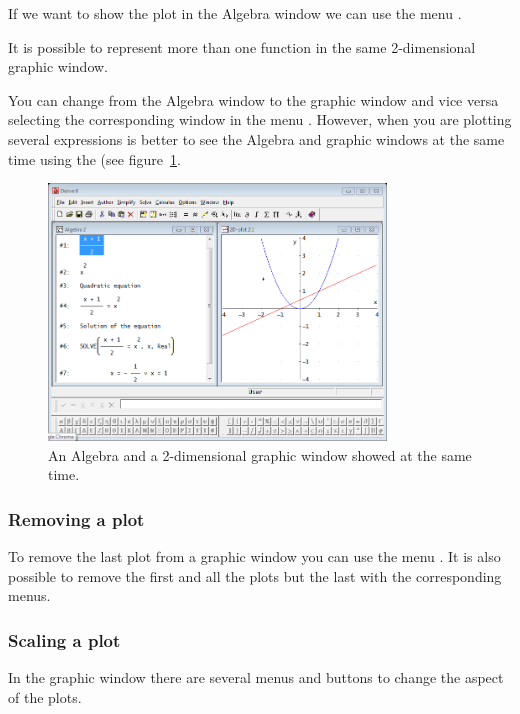 If we want to show the plot in the Algebra window we can use the menu .

It is possible to represent more than one function in the same 2-dimensional graphic window. 

You can change from the Algebra window to the graphic window and vice versa selecting the corresponding window in the menu .
However, when you are plotting several expressions is better to see the Algebra and graphic windows at the same time using the  (see figure~\ref{g:algebra-2d-plot}.

\begin{figure}[h!]
\begin{center}
\includegraphics[width=0.8\textwidth]{img/introduction/algebra_2d-plot}
\caption{An Algebra and a 2-dimensional graphic window showed at the same time.} 
\label{g:algebra-2d-plot}
\end{center}
\end{figure}

\subsubsection*{Removing a plot}
To remove the last plot from a graphic window you can use the menu . 
It is also possible to remove the first and all the plots but the last with the corresponding menus. 

\subsubsection*{Scaling a plot}
In the graphic window there are several menus and buttons to change the aspect of the plots. 

